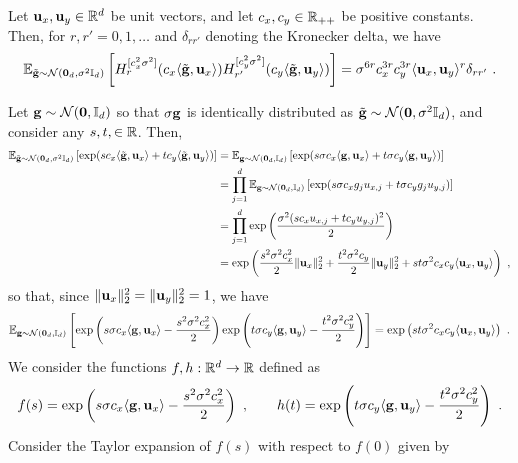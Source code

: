 \begin{lemm}
Let $\mathbf{u}_x,\mathbf{u}_y \in \mathbb{R}^d$ be unit vectors, and let $c_x, c_y \in \mathbb{R}_{++}$ be positive constants. Then, for $r,r'=0,1,\ldots$ and $\delta_{rr'}$ denoting the Kronecker delta, we have
\begin{align}
\mathbb{E}_{\tilde{\mathbf{g}} \sim {\cal N}(\bm{0}_d,\sigma^2 \mathbb{I}_d)}\left[ H_r^{[c_x^2 \sigma^2]}(c_x \langle \tilde{\mathbf{g}}, \mathbf{u}_x\rangle) H_{r'}^{[c_y^2 \sigma^2]}(c_y \langle \tilde{\mathbf{g}}, \mathbf{u}_y \rangle) \right] = \sigma^{6r}  c_x^{3r} c_y^{3r} \langle \mathbf{u}_x, \mathbf{u}_y \rangle^r \delta_{rr'}~.
\end{align}
\label{lemm:hermprod}
\end{lemm}
\proof Let $\mathbf{g} \sim {\cal N}(\bm{0},\mathbb{I}_d)$ so that $\sigma\mathbf{g}$ is identically distributed as $\tilde{\mathbf{g}} \sim {\cal N}(\bm{0},\sigma^2 \mathbb{I}_d)$, and consider any $s,t,\in\mathbb{R}$. Then,
\begin{align*}
\mathbb{E}_{\tilde{\mathbf{g}} \sim {\cal N}(\bm{0}_d,\sigma^2 \mathbb{I}_d)}\left[ \exp(s c_x \langle \tilde{\mathbf{g}},\mathbf{u}_x\rangle + t c_y \langle \tilde{\mathbf{g}},\mathbf{u}_y\rangle) \right] 
& = \mathbb{E}_{\mathbf{g} \sim {\cal N}(\bm{0}_d,\mathbb{I}_d)}\left[ \exp(s\sigma c_x \langle \mathbf{g},\mathbf{u}_x\rangle + t \sigma c_y \langle \mathbf{g},\mathbf{u}_y\rangle) \right]\\
& = \prod_{j=1}^d \mathbb{E}_{\mathbf{g} \sim {\cal N}(\bm{0}_d,\mathbb{I}_d)}\left[ \exp(s \sigma c_x g_j u_{x,j} + t \sigma c_y g_j u_{y,j}) \right] \\
& = \prod_{j=1}^d \exp\left( \frac{\sigma^2 (s c_x u_{x,j} + t c_y u_{y,j})^2}{2} \right) \\
& = \exp\left( \frac{s^2 \sigma^2 c_x^2}{2} \| \mathbf{u}_x\|_2^2 + \frac{t^2 \sigma^2 c_y}{2} \| \mathbf{u}_y \|_2^2 + st \sigma^2 c_x c_y \langle \mathbf{u}_x, \mathbf{u}_y \rangle \right) ~,
\end{align*}
so that, since $\|\mathbf{u}_x\|_2^2 = \|\mathbf{u}_y \|_2^2 = 1$, we have
\begin{align}
\mathbb{E}_{\mathbf{g} \sim {\cal N}(\bm{0}_d,\mathbb{I}_d)}\left[ \exp\left(s\sigma c_x \langle \mathbf{g},\mathbf{u}_x\rangle - \frac{s^2\sigma^2 c_x^2}{2}  \right) \exp \left( t \sigma c_y \langle \mathbf{g},\mathbf{u}_y\rangle - \frac{t^2 \sigma^2 c_y^2}{2}  \right) \right] =  \exp\left( st \sigma^2 c_x c_y \langle \mathbf{u}_x, \mathbf{u}_y \rangle \right) ~.
\label{eq:hermprod1}
\end{align}
We consider the functions $f,h : \mathbb{R}^d \to \mathbb{R}$ defined as
\begin{align}
    f(s) = \exp \left( s\sigma c_x \langle \mathbf{g},\mathbf{u}_x \rangle - \frac{s^2\sigma^2 c_x^2}{2} \right)~, \qquad h(t) = \exp \left( t\sigma c_y \langle \mathbf{g},\mathbf{u}_y\rangle - \frac{t^2\sigma^2 c_y^2}{2} \right)~.
\end{align}
Consider the Taylor expansion of $f(s)$ with respect to $f(0)$ given by
